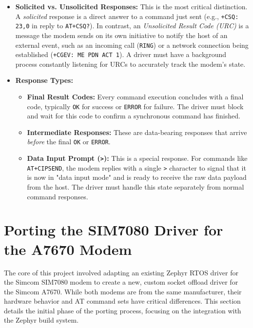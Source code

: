 \begin{itemize}
    \item \textbf{Solicited vs. Unsolicited Responses:} This is the most critical distinction. A \textit{solicited} response is a direct answer to a command just sent (e.g., \texttt{+CSQ: 23,0} in reply to \texttt{AT+CSQ?}). In contrast, an \textit{Unsolicited Result Code (URC)} is a message the modem sends on its own initiative to notify the host of an external event, such as an incoming call (\texttt{RING}) or a network connection being established (\texttt{+CGEV: ME PDN ACT 1}). A driver must have a background process constantly listening for URCs to accurately track the modem's state.

    \item \textbf{Response Types:}
    \begin{itemize}
        \item \textbf{Final Result Codes:} Every command execution concludes with a final code, typically \texttt{OK} for success or \texttt{ERROR} for failure. The driver must block and wait for this code to confirm a synchronous command has finished.
        \item \textbf{Intermediate Responses:} These are data-bearing responses that arrive \textit{before} the final \texttt{OK} or \texttt{ERROR}.
        \item \textbf{Data Input Prompt (\texttt{>}):} This is a special response. For commands like \texttt{AT+CIPSEND}, the modem replies with a single \texttt{>} character to signal that it is now in "data input mode" and is ready to receive the raw data payload from the host. The driver must handle this state separately from normal command responses.
    \end{itemize}
\end{itemize}


\section{Porting the SIM7080 Driver for the A7670 Modem}

The core of this project involved adapting an existing Zephyr RTOS driver for the Simcom SIM7080 modem to create a new, custom socket offload driver for the Simcom A7670. While both modems are from the same manufacturer, their hardware behavior and AT command sets have critical differences. This section details the initial phase of the porting process, focusing on the integration with the Zephyr build system.

